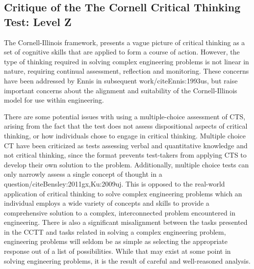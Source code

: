 \subsection{Critique of the The Cornell Critical Thinking Test: Level Z}

The Cornell-Illinois framework, presents a vague picture of critical thinking as a set of cognitive skills that are applied to form a course of action.  However, the type of thinking required in solving complex engineering problems is not linear in nature, requiring continual assessment, reflection and monitoring.  These concerns have been addressed by Ennis in subsequent work/cite{Ennis:1993us}, but raise important concerns about the alignment and suitability of the Cornell-Illinois model for use within engineering.  

There are some potential issues with using a multiple-choice assessment of CTS, arising from the fact that the test does not assess dispositional aspects of critical thinking, or how individuals chose to engage in critical thinking.  Multiple choice CT have been criticized as tests assessing verbal and quantitative knowledge and not critical thinking, since the format prevents test-takers from applying CTS to develop their own solution to the problem\cite{Abrami:2008td, Ku:2009uj}. Additionally, multiple choice tests can only narrowly assess a single concept of thought in a question/cite{Bensley:2011gx,Ku:2009uj}. This is opposed to the real-world application of critical thinking to solve complex engineering problems which an individual employs a wide variety of concepts and skills to provide a comprehensive solution to a complex, interconnected problem encountered in engineering.  There is also a significant misalignment between the tasks presented in the CCTT and tasks related in solving a complex engineering problem, engineering problems will seldom be as simple as selecting the appropriate response out of a list of possibilities.  While that may exist at some point in solving engineering problems, it is the result of careful and well-reasoned analysis.